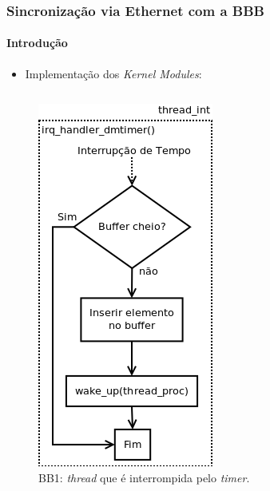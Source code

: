 \begin{frame}
\frametitle{Sincronização via Ethernet com a BBB }
\framesubtitle{Introdução}
\begin{itemize}
  \item Implementação dos \textit{Kernel Modules}:
\end{itemize}

\vspace{-12pt}

\begin{columns}

\begin{column}{.33\textwidth}

\begin{figure}[h!]
	
  \centering
  \includegraphics[scale=0.260]{image/thread_int}
  \caption{\centering BB1: \textit{thread} que é interrompida pelo
  \textit{timer}.}
  \label{fig:thread_int}
\end{figure}
\end{column}
		  
\begin{column}{.33\textwidth}


\end{column}
\end{columns}
\end{frame}
